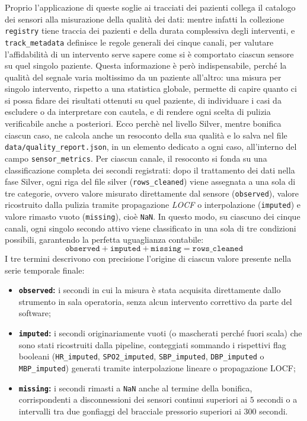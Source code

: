 Proprio l'applicazione di queste soglie ai tracciati dei pazienti collega il catalogo dei sensori alla misurazione della qualit\`a dei dati: mentre infatti la collezione \texttt{registry} tiene traccia dei pazienti e della durata complessiva degli interventi, e \texttt{track\_metadata} definisce le regole generali dei cinque canali, per valutare l'affidabilit\`a di un intervento serve sapere come si \`e comportato ciascun sensore su quel singolo paziente. Questa informazione \`e per\`o indispensabile, perch\'e la qualit\`a del segnale varia moltissimo da un paziente all'altro: una misura per singolo intervento, rispetto a una statistica globale, permette di capire quanto ci si possa fidare dei risultati ottenuti su quel paziente, di individuare i casi da escludere o da interpretare con cautela, e di rendere ogni scelta di pulizia verificabile anche a posteriori. Ecco perch\`e nel livello Silver, mentre bonifica ciascun caso, ne calcola anche un resoconto della sua qualit\`a e lo salva nel file \texttt{data/quality\_report.json}, in un elemento dedicato a ogni caso, all'interno del campo \texttt{sensor\_metrics}. Per ciascun canale, il resoconto si fonda su una classificazione completa dei secondi registrati: dopo il trattamento dei dati nella fase Silver, ogni riga del file silver (\texttt{rows\_cleaned}) viene assegnata a una sola di tre categorie, ovvero valore misurato direttamente dal sensore (\texttt{observed}), valore ricostruito dalla pulizia tramite propagazione \textit{LOCF} o interpolazione (\texttt{imputed}) e valore rimasto vuoto (\texttt{missing}), cio\`e \texttt{NaN}.
 In questo modo, su ciascuno dei cinque canali, ogni singolo secondo attivo viene classificato in una sola di tre condizioni possibili, garantendo la perfetta uguaglianza contabile:
$$\texttt{observed} + \texttt{imputed} + \texttt{missing} = \texttt{rows\_cleaned}$$
I tre termini descrivono con precisione l'origine di ciascun valore presente nella serie temporale finale:
\begin{itemize}
    \item \textbf{\texttt{observed}:} i secondi in cui la misura \`e stata acquisita direttamente dallo strumento in sala operatoria, senza alcun intervento correttivo da parte del software;    \item \textbf{\texttt{imputed}:} i secondi originariamente vuoti (o mascherati perch\'e fuori scala) che sono stati ricostruiti dalla pipeline, conteggiati sommando i rispettivi flag booleani (\texttt{HR\_imputed}, \texttt{SPO2\_imputed}, \texttt{SBP\_imputed}, \texttt{DBP\_imputed} o \texttt{MBP\_imputed}) generati tramite interpolazione lineare o propagazione LOCF;    \item \textbf{\texttt{missing}:} i secondi rimasti a \texttt{NaN} anche al termine della bonifica, corrispondenti a disconnessioni dei sensori continui superiori ai $5$ secondi o a intervalli tra due gonfiaggi del bracciale pressorio superiori ai $300$ secondi.\end{itemize}

